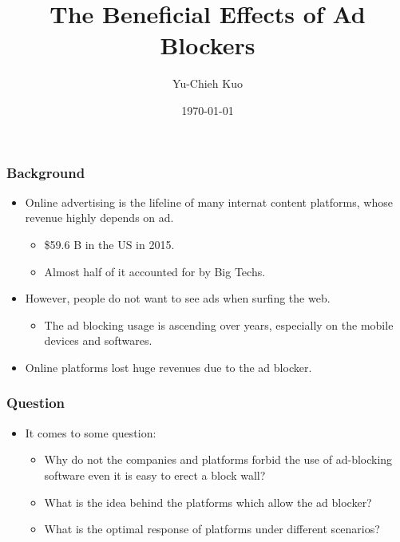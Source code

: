 \documentclass{beamer}
\title{
    The Beneficial Effects of Ad Blockers
}
\author{Yu-Chieh Kuo\inst{1}}
\date{\today}
\institute[NTU]
{
    \inst{1}
    Department of Information Management,
    National Taiwan University
}
\begin{document}
\begin{frame}
\titlepage
\end{frame} 
\begin{frame}[label=current]
    \frametitle{Background}
    \begin{itemize}
        \item
        Online advertising is the lifeline of many internat content platforms,
        whose revenue highly depends on ad.
        \begin{itemize}
            \item
                \$59.6 B in the US in 2015.
            \item
                Almost half of it accounted for by Big Techs.
        \end{itemize}
        \item However, people do not want to see ads when surfing the web.
        \begin{itemize}
            \item The ad blocking usage is ascending over years, especially
                on the mobile devices and softwares.
        \end{itemize}
    \item Online platforms lost huge revenues due to the ad blocker.
\end{itemize}
\end{frame}

\begin{frame}
    \frametitle{Question}
    \begin{itemize}
        \item It comes to some question:
        \begin{itemize}
            \item Why do not the companies and platforms forbid the use
            of ad-blocking software even it is easy to erect a block wall?
            \item What is the idea behind the platforms which allow the ad blocker?
            \item What is the optimal response of platforms under different 
            scenarios?
        \end{itemize}
    \end{itemize}
\end{frame}
\end{document}

